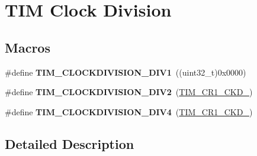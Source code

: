 \hypertarget{group___t_i_m___clock_division}{}\section{T\+IM Clock Division}
\label{group___t_i_m___clock_division}
\subsection*{Macros}
\begin{DoxyCompactItemize}
\item 
\#define {\bfseries T\+I\+M\+\_\+\+C\+L\+O\+C\+K\+D\+I\+V\+I\+S\+I\+O\+N\+\_\+\+D\+I\+V1}~((uint32\+\_\+t)0x0000)\hypertarget{group___t_i_m___clock_division_ga309297ccd407a836ede6a42d4dc479c1}{}\label{group___t_i_m___clock_division_ga309297ccd407a836ede6a42d4dc479c1}

\item 
\#define {\bfseries T\+I\+M\+\_\+\+C\+L\+O\+C\+K\+D\+I\+V\+I\+S\+I\+O\+N\+\_\+\+D\+I\+V2}~(\hyperlink{group___peripheral___registers___bits___definition_ga458d536d82aa3db7d227b0f00b36808f}{T\+I\+M\+\_\+\+C\+R1\+\_\+\+C\+K\+D\+\_})\hypertarget{group___t_i_m___clock_division_gaf84a16da8edb80a3d8af91fbfc046181}{}\label{group___t_i_m___clock_division_gaf84a16da8edb80a3d8af91fbfc046181}

\item 
\#define {\bfseries T\+I\+M\+\_\+\+C\+L\+O\+C\+K\+D\+I\+V\+I\+S\+I\+O\+N\+\_\+\+D\+I\+V4}~(\hyperlink{group___peripheral___registers___bits___definition_ga7ff2d6c2c350e8b719a8ad49c9a6bcbe}{T\+I\+M\+\_\+\+C\+R1\+\_\+\+C\+K\+D\+\_})\hypertarget{group___t_i_m___clock_division_ga7cac7491610ffc135ea9ed54f769ddbc}{}\label{group___t_i_m___clock_division_ga7cac7491610ffc135ea9ed54f769ddbc}

\end{DoxyCompactItemize}


\subsection{Detailed Description}
